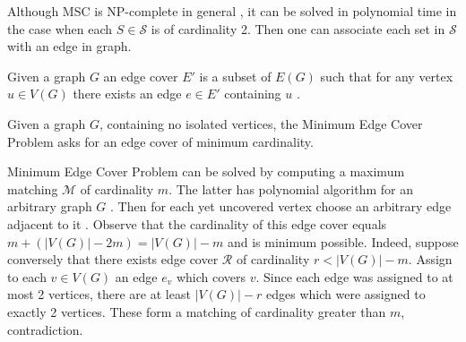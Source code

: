 Although MSC is NP-complete in general \cite{Karp1972}, it can be solved in polynomial time in the case when each $S\in \mathcal{S}$ is of cardinality 2. Then one can associate each set in $\mathcal{S}$ with an edge in graph. 
\begin{definition}
Given a graph $G$ an edge cover $E'$ is a subset of $E(G)$ such that for any vertex $u \in V(G)$ there exists an edge $e \in E'$ containing $u$ \cite{Garey90}.
\end{definition}
\begin{definition}\label{mecp}
Given a graph $G$, containing no isolated vertices, the Minimum Edge Cover Problem asks for an edge cover of minimum cardinality.
\end{definition}
Minimum Edge Cover Problem can be solved by computing a maximum matching $\mathcal{M}$ of cardinality $m$. The latter has polynomial algorithm for an arbitrary graph $G$ \cite{edmonds_1965}. Then for each yet uncovered vertex choose an arbitrary edge adjacent to it \cite{VANROOIJ20112147}. Observe that the cardinality of this edge cover equals $m + (|V(G)| - 2m) = |V(G)| - m$ and is minimum possible. Indeed, suppose conversely that there exists edge cover $\mathcal{R}$ of cardinality $r < |V(G)| - m$. Assign to each $v \in V(G)$ an edge $e_v$ which covers $v$. Since each edge was assigned to at most 2 vertices, there are at least $|V(G)| - r$ edges which were assigned to exactly 2 vertices. These form a matching of cardinality greater than $m$, contradiction.

